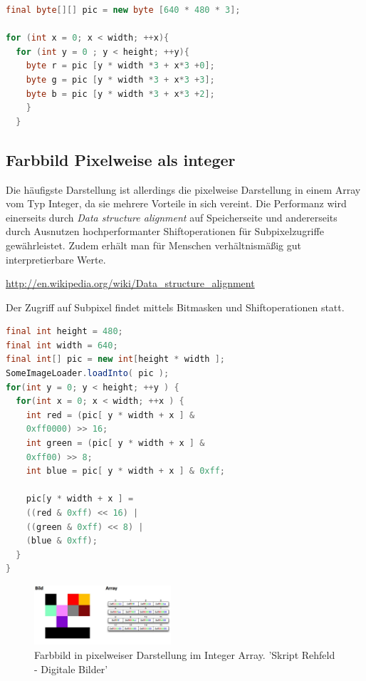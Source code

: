 \documentclass[tog]{acmsiggraph}
\begin{document}
\begin{lstlisting}[language=Java]
final byte[][] pic = new byte [640 * 480 * 3];

for (int x = 0; x < width; ++x){
  for (int y = 0 ; y < height; ++y){
    byte r = pic [y * width *3 + x*3 +0]; 
    byte g = pic [y * width *3 + x*3 +3];
    byte b = pic [y * width *3 + x*3 +2];
    }
  }
\end{lstlisting}

\subsection{Farbbild Pixelweise als integer}
Die häufigste Darstellung ist allerdings die pixelweise Darstellung in einem Array vom Typ Integer, da sie mehrere Vorteile in sich vereint. Die Performanz wird einerseits durch \textit{Data structure alignment} auf Speicherseite und andererseits durch Ausnutzen hochperformanter Shiftoperationen für Subpixelzugriffe gewährleistet. Zudem erhält man für Menschen verhältnismäßig gut interpretierbare Werte.

{\small\url{http://en.wikipedia.org/wiki/Data_structure_alignment}}

Der Zugriff auf Subpixel findet mittels Bitmasken und Shiftoperationen statt.

\begin{lstlisting}[language=Java]
final int height = 480;
final int width = 640;
final int[] pic = new int[height * width ];
SomeImageLoader.loadInto( pic );
for(int y = 0; y < height; ++y ) {
  for(int x = 0; x < width; ++x ) {
    int red = (pic[ y * width + x ] &
    0xff0000) >> 16;
    int green = (pic[ y * width + x ] &
    0xff00) >> 8;
    int blue = pic[ y * width + x ] & 0xff;

    pic[y * width + x ] = 
    ((red & 0xff) << 16) | 
    ((green & 0xff) << 8) | 
    (blue & 0xff);
  }
}
\end{lstlisting}

\begin{figure}[ht]
  \centering
  \includegraphics[width=2.0in]{images/BildPixelweiseInteger}
  \caption{Farbbild in pixelweiser Darstellung im Integer Array. 'Skript Rehfeld - Digitale Bilder'}
  \label{fig:Pixelweise Darstellung im Array.}
\end{figure}
\end{document}
